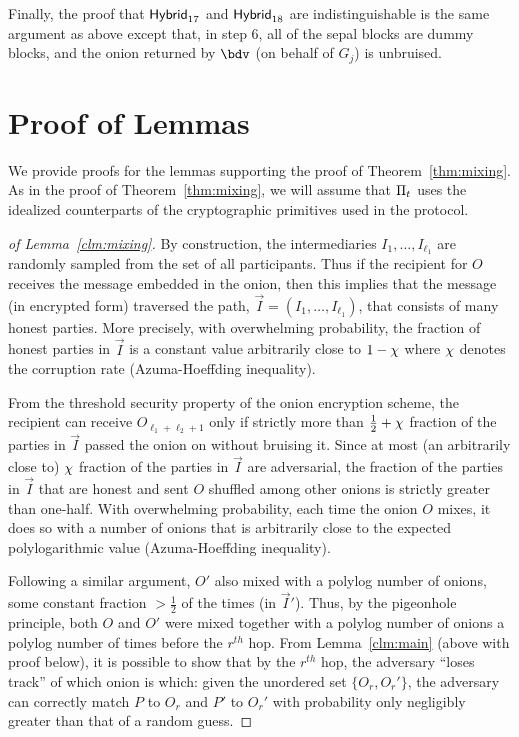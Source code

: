 \documentclass[runningheads,a4paper]{llncs}
\begin{document}
Finally, the proof that $\mathsf{Hybrid}_{17}$ and $\mathsf{Hybrid}_{18}$ are indistinguishable is the same argument as above except that, in step 6, all of the sepal blocks are dummy blocks, and the onion returned by $\bdv$ (on behalf of $G_j$) is unbruised.


\section{Proof of Lemmas}
We provide proofs for the lemmas supporting the proof of Theorem~\ref{thm:mixing}. 
As in the proof of Theorem~\ref{thm:mixing}, we will assume that $\Pi_t$ uses the idealized counterparts of the cryptographic primitives used in the protocol.

\begin{proof} [of Lemma~\ref{clm:mixing}]
By construction, the intermediaries $I_1, \dots, I_{\ell_1}$ are randomly sampled from the set of all participants. Thus if the recipient for $O$ receives the message embedded in the onion, then this implies that the message (in encrypted form) traversed the path, $\vec{I} = (I_1, \dots, I_{\ell_1})$, that consists of many honest parties. More precisely, with overwhelming probability, the fraction of honest parties in $\vec{I}$ is a constant value arbitrarily close to $1-\chi$ where $\chi$ denotes the corruption rate (Azuma-Hoeffding inequality). %

From the threshold security property of the onion encryption scheme, the recipient can receive $O_{\ell_1+\ell_2+1}$ only if strictly more than $\frac{1}{2} + \chi$ fraction of the parties in $\vec{I}$ passed the onion on without bruising it. Since at most (an arbitrarily close to) $\chi$ fraction of the parties in $\vec{I}$ are adversarial, the fraction of the parties in $\vec{I}$ that are honest and sent $O$ shuffled among other onions is strictly greater than one-half. With overwhelming probability, each time the onion $O$ mixes, it does so with a number of onions that is arbitrarily close to the expected polylogarithmic value 
(Azuma-Hoeffding inequality). 

Following a similar argument, $O'$ also mixed with a polylog number of onions, some constant fraction $>\frac{1}{2}$ of the times (in $\vec{I}'$). Thus, by the pigeonhole principle, both $O$ and $O'$ were mixed together with a polylog number of onions a polylog number of times before the $r^{th}$ hop. From Lemma~\ref{clm:main} (above with proof below), it is possible to show that by the $r^{th}$ hop, the adversary ``loses track'' of which onion is which: given the unordered set $\{O_r, O_r'\}$, the adversary can correctly match $P$ to $O_r$ and $P'$ to $O_r'$ with probability only negligibly greater than that of a random guess. 
\end{proof}
\end{document}
